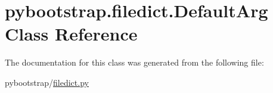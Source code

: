 \hypertarget{classpybootstrap_1_1filedict_1_1DefaultArg}{\section{pybootstrap.\-filedict.\-Default\-Arg Class Reference}
\label{classpybootstrap_1_1filedict_1_1DefaultArg}
}


The documentation for this class was generated from the following file\-:\begin{DoxyCompactItemize}
\item 
pybootstrap/\hyperlink{filedict_8py}{filedict.\-py}\end{DoxyCompactItemize}
